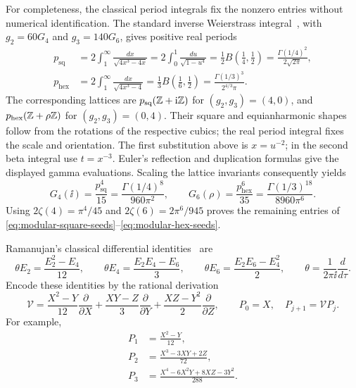 For completeness, the classical period integrals fix the nonzero
entries without numerical identification. The standard inverse
Weierstrass integral~\cite{DLMF}, with
\(g_2=60G_4\) and \(g_3=140G_6\), gives positive real periods
\begin{align*}
p_{\mathrm{sq}}
&=2\int_1^\infty\frac{dx}{\sqrt{4x^3-4x}}
 =2\int_0^1\frac{du}{\sqrt{1-u^4}}
 =\frac12 B\!\left(\frac14,\frac12\right)
 =\frac{\Gamma(1/4)^2}{2\sqrt{2\pi}},\\
p_{\mathrm{hex}}
&=2\int_1^\infty\frac{dx}{\sqrt{4x^3-4}}
 =\frac13 B\!\left(\frac16,\frac12\right)
 =\frac{\Gamma(1/3)^3}{2^{4/3}\pi}.
\end{align*}
The corresponding lattices are
\(p_{\mathrm{sq}}(\mathbb{Z}+\mathrm{i}\mathbb{Z})\) for \((g_2,g_3)=(4,0)\), and
\(p_{\mathrm{hex}}(\mathbb{Z}+\rho\mathbb{Z})\) for \((g_2,g_3)=(0,4)\).
Their square and equianharmonic shapes follow from the rotations of
the respective cubics; the real period integral fixes the scale and
orientation. The first substitution above is \(x=u^{-2}\); in the
second beta integral use \(t=x^{-3}\). Euler's reflection and
duplication formulas give the displayed gamma evaluations.
Scaling the lattice invariants consequently yields
\[
G_4(\ii)=\frac{p_{\mathrm{sq}}^4}{15}
 =\frac{\Gamma(1/4)^8}{960\pi^2},\qquad
G_6(\rho)=\frac{p_{\mathrm{hex}}^6}{35}
 =\frac{\Gamma(1/3)^{18}}{8960\pi^6}.
\]
Using \(2\zeta(4)=\pi^4/45\) and
\(2\zeta(6)=2\pi^6/945\) proves the remaining entries of
\eqref{eq:modular-square-seeds}--\eqref{eq:modular-hex-seeds}.

Ramanujan's classical differential identities~\cite{Ramanujan} are
\begin{equation}
\theta E_2=\frac{E_2^2-E_4}{12},\qquad
\theta E_4=\frac{E_2E_4-E_6}{3},\qquad
\theta E_6=\frac{E_2E_6-E_4^2}{2},\qquad
\theta=\frac1{2\pi\ii}\frac{d}{d\tau}.
\label{eq:modular-Ramanujan-system}
\end{equation}
Encode these identities by the rational derivation
\begin{equation}
\mathcal V
=\frac{X^2-Y}{12}\frac{\partial}{\partial X}
 +\frac{XY-Z}{3}\frac{\partial}{\partial Y}
 +\frac{XZ-Y^2}{2}\frac{\partial}{\partial Z},
\qquad P_0=X,\quad P_{j+1}=\mathcal V P_j.
\label{eq:modular-P-recurrence}
\end{equation}
For example,
\begin{align*}
P_1&=\frac{X^2-Y}{12},\\
P_2&=\frac{X^3-3XY+2Z}{72},\\
P_3&=\frac{X^4-6X^2Y+8XZ-3Y^2}{288}.
\end{align*}

